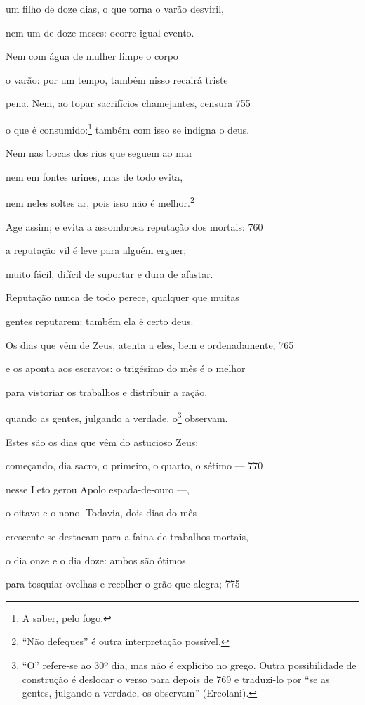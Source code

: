 um filho de doze dias, o que torna o varão desviril,

nem um de doze meses: ocorre igual evento.

Nem com água de mulher limpe o corpo

o varão: por um tempo, também nisso recairá triste

pena. Nem, ao topar sacrifícios chamejantes, censura \num{755}

o que é consumido:\footnote{A saber, pelo fogo.} também com isso se indigna o deus.

Nem nas bocas dos rios que seguem ao mar

nem em fontes urines, mas de todo evita,

nem neles soltes ar, pois isso não é melhor.\footnote{``Não defeques'' é outra interpretação possível.}

Age assim; e evita a assombrosa reputação dos mortais: \num{760}

a reputação vil é leve para alguém erguer,

muito fácil, difícil de suportar e dura de afastar.

Reputação nunca de todo perece, qualquer que muitas

gentes reputarem: também ela é certo deus.

Os dias que vêm de Zeus, atenta a eles, bem e \qb{}ordenadamente, \num{765}

e os aponta aos escravos: o trigésimo do mês é o melhor

para vistoriar os trabalhos e distribuir a ração,

quando as gentes, julgando a verdade, o\footnote{``O'' refere-se ao 30º dia, mas não é explícito no grego. Outra
possibilidade de construção é deslocar o verso para depois de 769 e
traduzi-lo por ``se as gentes, julgando a verdade, os observam''
(Ercolani).} observam.

Estes são os dias que vêm do astucioso Zeus:

começando, dia sacro, o primeiro, o quarto, o sétimo --- \num{770}

nesse Leto gerou Apolo espada-de-ouro ---,

o oitavo e o nono. Todavia, dois dias do mês

crescente se destacam para a faina de trabalhos mortais,

o dia onze e o dia doze: ambos são ótimos

para tosquiar ovelhas e recolher o grão que alegra; \num{775}

